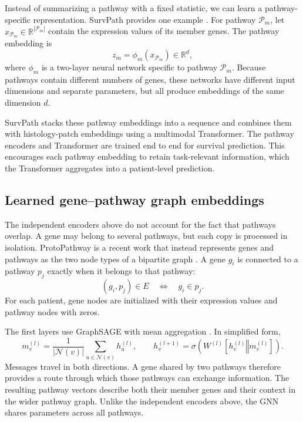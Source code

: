 \documentclass[11pt]{article}
\begin{document}
Instead of summarizing a pathway with a fixed statistic, we can learn a
pathway-specific representation. SurvPath provides one example
\cite{jaume2024modeling}. For pathway $\mathcal{P}_m$, let
$x_{\mathcal{P}_m}\in\mathbb{R}^{|\mathcal{P}_m|}$ contain the expression
values of its member genes. The pathway embedding is
\begin{equation}
    z_m = \phi_m\!\left(x_{\mathcal{P}_m}\right) \in \mathbb{R}^{d},
\end{equation}
where $\phi_m$ is a two-layer neural network specific to pathway
$\mathcal{P}_m$. Because pathways contain different numbers of genes, these
networks have different input dimensions and separate parameters, but all
produce embeddings of the same dimension $d$.

SurvPath stacks these pathway embeddings into a sequence and combines them
with histology-patch embeddings using a multimodal Transformer. The pathway
encoders and Transformer are trained end to end for survival prediction. This
encourages each pathway embedding to retain task-relevant information, which
the Transformer aggregates into a patient-level prediction.

\subsection{Learned gene--pathway graph embeddings}

The independent encoders above do not account for the fact that pathways
overlap. A gene may belong to several pathways, but each copy is processed in
isolation. ProtoPathway is a recent work that instead represents genes and pathways as the two node
types of a bipartite graph \cite{gallaghersyed2026protopathway}. A gene $g_i$
is connected to a pathway $p_j$ exactly when it belongs to that pathway:
\begin{equation}
    (g_i,p_j)\in E \quad\Longleftrightarrow\quad g_i\in p_j.
\end{equation}
For each patient, gene nodes are initialized with their expression values and
pathway nodes with zeros.

The first layers use GraphSAGE with mean aggregation
\cite{hamilton2017inductive}. In simplified form,
\begin{equation}
    m_v^{(l)} = \frac{1}{|\mathcal{N}(v)|}
    \sum_{u\in\mathcal{N}(v)}h_u^{(l)},
    \qquad
    h_v^{(l+1)} = \sigma\!\left(
    W^{(l)}[h_v^{(l)}\mathbin\Vert m_v^{(l)}]
    \right).
\end{equation}
Messages travel in both directions. A gene shared by two pathways therefore
provides a route through which those pathways can exchange information. The
resulting pathway vectors describe both their member genes and their context in
the wider pathway graph. Unlike the independent encoders above, the GNN shares
parameters across all pathways.
\end{document}
